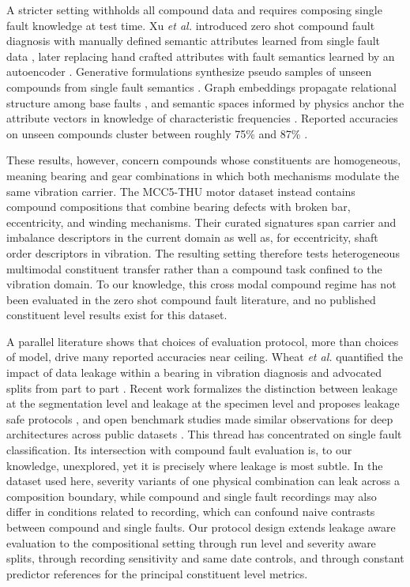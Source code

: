 \documentclass{ieeeaccess}
\begin{document}
A stricter setting withholds all compound data and requires composing single
fault knowledge at test time. Xu \emph{et al.} introduced zero shot compound
fault diagnosis with manually defined semantic attributes learned from single
fault data \cite{eswa2022}, later replacing hand crafted attributes with
fault semantics learned by an autoencoder \cite{eswa2023}. Generative
formulations synthesize pseudo samples of unseen compounds from single fault
semantics \cite{zsl2021,kbs2025}. Graph embeddings propagate relational
structure among base faults \cite{neuro2025}, and semantic spaces informed by
physics anchor the attribute vectors in knowledge of characteristic
frequencies \cite{song2025gzsl}. Reported accuracies on unseen compounds
cluster between roughly 75\% and 87\%
\cite{eswa2022,eswa2023,song2025gzsl,appac2025}.

These results, however, concern compounds whose constituents are homogeneous,
meaning bearing and gear combinations in which both mechanisms modulate the
same vibration carrier. The MCC5-THU motor dataset instead contains compound
compositions that combine bearing defects with broken bar, eccentricity, and
winding mechanisms. Their curated signatures span carrier and imbalance
descriptors in the current domain as well as, for eccentricity, shaft order
descriptors in vibration. The resulting setting therefore tests heterogeneous
multimodal constituent transfer rather than a compound task confined to the
vibration domain. To our knowledge, this cross modal compound regime has not
been evaluated in the zero shot compound fault literature, and no published
constituent level results exist for this dataset.

A parallel literature shows that choices of evaluation protocol, more than
choices of model, drive many reported accuracies near ceiling. Wheat
\emph{et al.} quantified the impact of data leakage within a bearing in
vibration diagnosis and advocated splits from part to part \cite{wheat2024}.
Recent work formalizes the distinction between leakage at the segmentation
level and leakage at the specimen level and proposes leakage safe protocols
\cite{gama2025,phme2025}, and open benchmark studies made similar
observations for deep architectures across public datasets
\cite{zhao2020benchmark}. This thread has concentrated on single fault
classification. Its intersection with compound fault evaluation is, to our
knowledge, unexplored, yet it is precisely where leakage is most subtle. In
the dataset used here, severity variants of one physical combination can leak
across a composition boundary, while compound and single fault recordings may
also differ in conditions related to recording, which can confound naive
contrasts between compound and single faults. Our protocol design extends
leakage aware evaluation to the compositional setting through run level and
severity aware splits, through recording sensitivity and same date controls,
and through constant predictor references for the principal constituent level
metrics.
\end{document}
